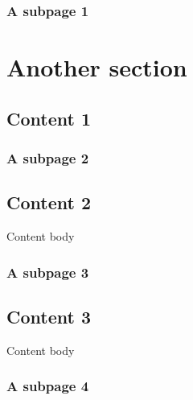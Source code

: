 \sphinxstepscope


\section{A subpage 1}
\label{\detokenize{subfolder/asubpage1:a-subpage-1}}\label{\detokenize{subfolder/asubpage1::doc}}
\sphinxstepscope


\part{Another section}

\sphinxstepscope


\chapter{Content 1}
\label{\detokenize{content1:content-1}}\label{\detokenize{content1::doc}}
\sphinxstepscope


\section{A subpage 2}
\label{\detokenize{subfolder/asubpage2:a-subpage-2}}\label{\detokenize{subfolder/asubpage2::doc}}
\sphinxstepscope


\chapter{Content 2}
\label{\detokenize{content2:content-2}}\label{\detokenize{content2::doc}}
\sphinxAtStartPar
Content body

\sphinxstepscope


\section{A subpage 3}
\label{\detokenize{subfolder/asubpage3:a-subpage-3}}\label{\detokenize{subfolder/asubpage3::doc}}
\sphinxstepscope


\chapter{Content 3}
\label{\detokenize{content3:content-3}}\label{\detokenize{content3::doc}}
\sphinxAtStartPar
Content body

\sphinxstepscope


\section{A subpage 4}
\label{\detokenize{subfolder/asubpage4:a-subpage-4}}\label{\detokenize{subfolder/asubpage4::doc}}






\renewcommand{\indexname}{Index}
\printindex
